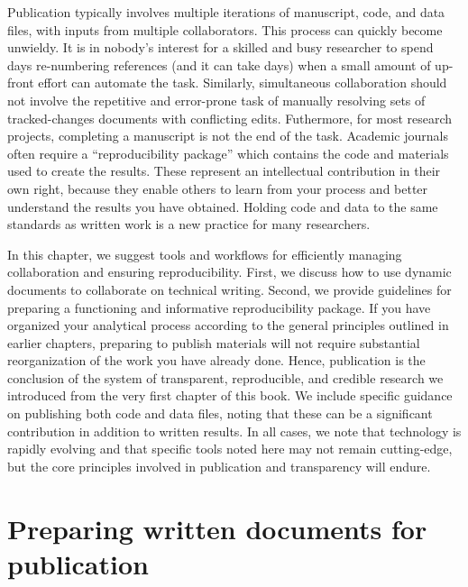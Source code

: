 
\begin{fullwidth}
Publication typically involves multiple iterations of manuscript,
code, and data files, with inputs from multiple collaborators.
This process can quickly become unwieldy.
It is in nobody's interest for a skilled and busy researcher
to spend days re-numbering references (and it can take days)
when a small amount of up-front effort can automate the task.
Similarly, simultaneous collaboration should not involve
the repetitive and error-prone task of manually resolving
sets of tracked-changes documents with conflicting edits.
Futhermore, for most research projects,
completing a manuscript is not the end of the task.
Academic journals often require a ``reproducibility package''
which contains the code and materials used to create the results.
These represent an intellectual contribution in their own right,
because they enable others to learn from your process
and better understand the results you have obtained.
Holding code and data to the same standards as written work
is a new practice for many researchers.

In this chapter, we suggest tools and workflows for efficiently managing collaboration
and ensuring reproducibility.
First, we discuss how to use dynamic documents to collaborate on technical writing.
Second, we provide guidelines for preparing a functioning and informative reproducibility package.
If you have organized your analytical process
according to the general principles outlined in earlier chapters,
preparing to publish materials will not require
substantial reorganization of the work you have already done.
Hence, publication is the conclusion of the system
of transparent, reproducible, and credible research we introduced
from the very first chapter of this book.
We include specific guidance on publishing both code and data files,
noting that these can be a significant contribution in addition to written results.
In all cases, we note that technology is rapidly evolving
and that specific tools noted here may not remain cutting-edge,
but the core principles involved in publication and transparency will endure.
\end{fullwidth}


\section{Preparing written documents for publication}


